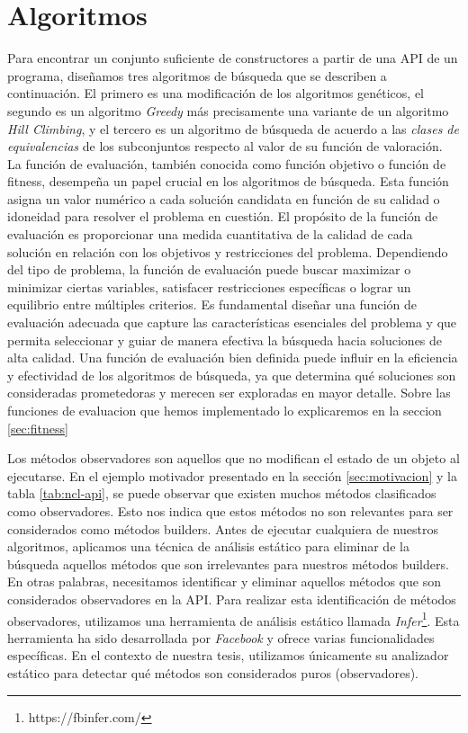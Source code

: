\section{Algoritmos}


\label{sec:algorithms}
Para encontrar un conjunto suficiente de constructores a partir de una API de un programa, diseñamos tres algoritmos de búsqueda que se describen a continuación. El primero es una modificación de los algoritmos genéticos, el segundo es un algoritmo \emph{Greedy} más precisamente una variante de un algoritmo \emph{Hill Climbing}, y el tercero es un algoritmo de búsqueda de acuerdo a las \emph{clases de equivalencias}  de los subconjuntos respecto al valor de su función de valoración.
La función de evaluación, también conocida como función objetivo o función de fitness, desempeña un papel crucial en los algoritmos de búsqueda. Esta función asigna un valor numérico a cada solución candidata en función de su calidad o idoneidad para resolver el problema en cuestión. El propósito de la función de evaluación es proporcionar una medida cuantitativa de la calidad de cada solución en relación con los objetivos y restricciones del problema. Dependiendo del tipo de problema, la función de evaluación puede buscar maximizar o minimizar ciertas variables, satisfacer restricciones específicas o lograr un equilibrio entre múltiples criterios. Es fundamental diseñar una función de evaluación adecuada que capture las características esenciales del problema y que permita seleccionar y guiar de manera efectiva la búsqueda hacia soluciones de alta calidad. Una función de evaluación bien definida puede influir en la eficiencia y efectividad de los algoritmos de búsqueda, ya que determina qué soluciones son consideradas prometedoras y merecen ser exploradas en mayor detalle. Sobre las funciones de evaluacion que hemos implementado lo explicaremos en la seccion \ref{sec:fitness}



Los métodos observadores son aquellos que no modifican el estado de un objeto al ejecutarse. En el ejemplo motivador presentado en la sección \ref{sec:motivacion} y la tabla \ref{tab:ncl-api}, se puede observar que existen muchos métodos clasificados como observadores. Esto nos indica que estos métodos no son relevantes para ser considerados como métodos builders. Antes de ejecutar cualquiera de nuestros algoritmos, aplicamos una técnica de análisis estático para eliminar de la búsqueda aquellos métodos que son irrelevantes para nuestros métodos builders. En otras palabras, necesitamos identificar y eliminar aquellos métodos que son considerados observadores en la API.
Para realizar esta identificación de métodos observadores, utilizamos una herramienta de análisis estático llamada \emph{Infer}\footnote{https://fbinfer.com/}. Esta herramienta ha sido desarrollada por \emph{Facebook} y ofrece varias funcionalidades específicas. En el contexto de nuestra tesis, utilizamos únicamente su analizador estático para detectar qué métodos son considerados puros (observadores).

